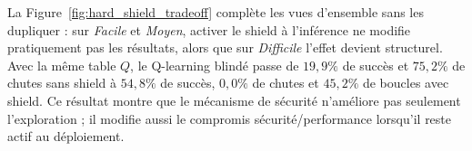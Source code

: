 \documentclass{article}
\begin{document}
La Figure~\ref{fig:hard_shield_tradeoff} complète les vues d'ensemble sans les dupliquer : sur \textit{Facile} et \textit{Moyen}, activer le shield à l'inférence ne modifie pratiquement pas les résultats, alors que sur \textit{Difficile} l'effet devient structurel. Avec la même table $Q$, le Q-learning blindé passe de $19{,}9\%$ de succès et $75{,}2\%$ de chutes sans shield à $54{,}8\%$ de succès, $0{,}0\%$ de chutes et $45{,}2\%$ de boucles avec shield. Ce résultat montre que le mécanisme de sécurité n'améliore pas seulement l'exploration ; il modifie aussi le compromis sécurité/performance lorsqu'il reste actif au déploiement.

\begin{table}[H]
  \centering
  \begin{minipage}[t]{0.62\linewidth}
    \caption{Indicateurs d'évaluation finale (politique greedy sans shield, 500 épisodes, moyenne $\pm$ écart-type, 10 répétitions). Chemin sûr : chevauchement $\geq 50\%$ avec Dijkstra (Difficile uniquement).}
    \label{tab:eval}
    \centering
    \scriptsize
\end{minipage}
\end{table}
\end{document}
